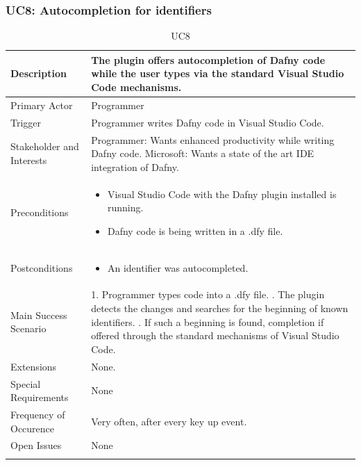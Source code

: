 \subsubsection{UC8: Autocompletion for identifiers}
\begin{longtable}{l | p{} }
	Description & The plugin offers autocompletion of Dafny code while the user types via the standard Visual Studio Code mechanisms.\\ \hline
	Primary Actor & Programmer\\ \hline
	Trigger & Programmer writes Dafny code in Visual Studio Code.\\ \hline
	Stakeholder and Interests & Programmer: Wants enhanced productivity while writing Dafny code. \newline Microsoft: Wants a state of the art IDE integration of Dafny.\\ \hline
	Preconditions &
	\begin{itemize}
		\item Visual Studio Code with the Dafny plugin installed is running.
		\item Dafny code is being written in a .dfy file.
	\end{itemize}\\ \hline
	Postconditions &
	\begin{itemize}
		\item An identifier was autocompleted.
	\end{itemize}\\ \hline
	Main Success Scenario & 
	1. Programmer types code into a .dfy file. \newline
	2. The plugin detects the changes and searches for the beginning of known identifiers. \newline
	3. If such a beginning is found, completion if offered through the standard mechanisms of Visual Studio Code.\\ \hline
	Extensions & 
	None. \\ \hline
	Special Requirements & None\\ \hline
	Frequency of Occurence & Very often, after every key up event.\\ \hline
	Open Issues & None \\ \hline
	\caption{UC8}
\end{longtable}